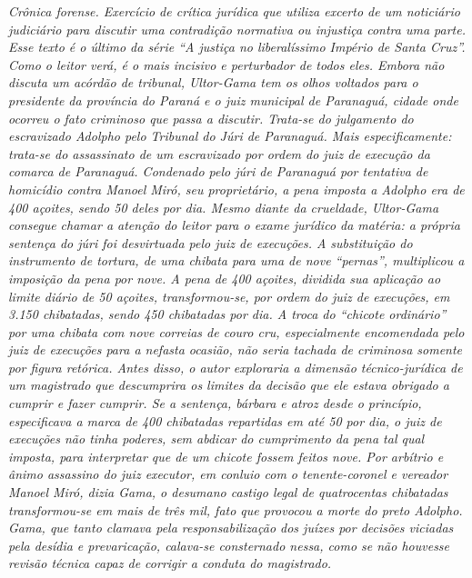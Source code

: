 \begin{didascalia}\itshape
Crônica forense. Exercício de crítica jurídica que utiliza excerto de um
noticiário judiciário para discutir uma contradição normativa ou
injustiça contra uma parte. Esse texto é o último da série ``A justiça
no liberalíssimo Império de Santa Cruz''. Como o leitor verá, é o
mais incisivo e perturbador de todos eles. Embora não discuta um acórdão
de tribunal, Ultor-Gama tem os olhos voltados para o presidente
da província do Paraná e o juiz municipal de Paranaguá, cidade onde
ocorreu o fato criminoso que passa a discutir. Trata-se do julgamento do
escravizado Adolpho pelo Tribunal do Júri de Paranaguá. Mais
especificamente: trata-se do assassinato de um escravizado
por ordem do juiz de execução da
comarca de Paranaguá. Condenado pelo júri de Paranaguá por tentativa de
homicídio contra Manoel Miró, seu proprietário, a pena imposta a Adolpho
era de 400 açoites, sendo 50 deles por dia. Mesmo diante da crueldade,
Ultor-Gama consegue chamar a atenção do leitor para o exame
jurídico da matéria: a própria sentença do júri foi desvirtuada pelo
juiz de execuções. A substituição do instrumento de tortura, de uma
chibata para uma de nove ``pernas'', multiplicou a imposição da pena por
nove. A pena de 400 açoites, dividida sua aplicação ao limite diário de
50 açoites, transformou-se, por ordem do juiz de execuções, em 3.150
chibatadas, sendo 450 chibatadas por dia.
A troca do ``chicote ordinário''
por uma chibata com nove correias de couro cru, especialmente
encomendada pelo juiz de execuções para a nefasta ocasião, não seria
tachada de criminosa somente por figura retórica. Antes disso, o autor
exploraria a dimensão técnico-jurídica de um magistrado que descumprira
os limites da decisão que ele estava obrigado a cumprir e fazer cumprir.
Se a sentença, bárbara e atroz desde o princípio, especificava a marca
de 400 chibatadas repartidas em até 50 por dia, o juiz de execuções não
tinha poderes, sem abdicar do cumprimento da pena tal qual imposta, para
interpretar que de um chicote fossem feitos nove. Por arbítrio e ânimo
assassino do juiz executor, em conluio com o tenente-coronel e vereador
Manoel Miró, dizia Gama, o desumano castigo legal de quatrocentas
chibatadas transformou-se em mais de três mil, fato que provocou a morte
do preto Adolpho. Gama, que tanto clamava pela responsabilização dos
juízes por decisões viciadas pela desídia e prevaricação, calava-se
consternado nessa, como se não houvesse revisão técnica capaz de
corrigir a conduta do magistrado.

\end{didascalia}
